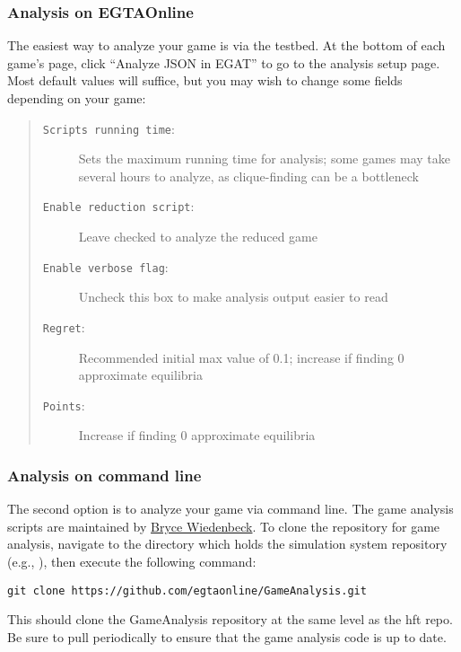 \documentclass[11pt]{article}
\begin{document}
\subsubsection{Analysis on EGTAOnline}

The easiest way to analyze your game is via the testbed.
At the bottom of each game's page, click ``Analyze JSON in EGAT'' to go to the analysis setup page. Most default values will suffice, but you may wish to change some fields depending on your game:

\begin{quote}
\begin{description}
\item[\texttt{Scripts running time}:] Sets the maximum running time for analysis; some games may take several hours to analyze, as clique-finding can be a bottleneck
\item[\texttt{Enable reduction script}:] Leave checked to analyze the reduced game
\item[\texttt{Enable verbose flag}:] Uncheck this box to make analysis output easier to read
\item[\texttt{Regret}:] Recommended initial max value of 0.1; increase if finding 0 approximate equilibria
\item[\texttt{Points}:] Increase if finding 0 approximate equilibria
\end{description}
\end{quote}


\subsubsection{Analysis on command line}

The second option is to analyze your game via command line.
The game analysis scripts are maintained by \href{mailto:btwied@umich.edu}{Bryce Wiedenbeck}. To clone the repository for game analysis, navigate to the directory which holds the simulation system repository (e.g., ), then execute the following command:
\begin{verbatim}
git clone https://github.com/egtaonline/GameAnalysis.git
\end{verbatim}
This should clone the GameAnalysis repository at the same level as the hft repo.
Be sure to pull periodically to ensure that the game analysis code is up to date.
\end{document}

